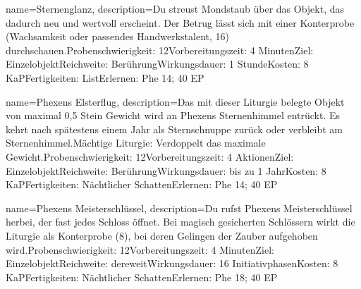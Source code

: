 {
    name={Sternenglanz},
    description={Du streust Mondstaub über das Objekt, das dadurch neu und wertvoll erscheint. Der Betrug lässt sich mit einer Konterprobe (Wachsamkeit oder passendes Handwerkstalent, 16) durchschauen.\newline Probenschwierigkeit: 12\newline Vorbereitungszeit: 4 Minuten\newline Ziel: Einzelobjekt\newline Reichweite: Berührung\newline Wirkungsdauer: 1 Stunde\newline Kosten: 8 KaP\newline Fertigkeiten: List\newline Erlernen: Phe 14; 40 EP}
}


{
    name={Phexens Elsterflug},
    description={Das mit dieser Liturgie belegte Objekt von maximal 0,5 Stein Gewicht wird an Phexens Sternenhimmel entrückt. Es kehrt nach spätestens einem Jahr als Sternschnuppe zurück oder verbleibt am Sternenhimmel.\newline Mächtige Liturgie: Verdoppelt das maximale Gewicht.\newline Probenschwierigkeit: 12\newline Vorbereitungszeit: 4 Aktionen\newline Ziel: Einzelobjekt\newline Reichweite: Berührung\newline Wirkungsdauer: bis zu 1 Jahr\newline Kosten: 8 KaP\newline Fertigkeiten: Nächtlicher Schatten\newline Erlernen: Phe 14; 40 EP}
}


{
    name={Phexens Meisterschlüssel},
    description={Du rufst Phexens Meisterschlüssel herbei, der fast jedes Schloss öffnet. Bei magisch gesicherten Schlössern wirkt die Liturgie als Konterprobe (8), bei deren Gelingen der Zauber aufgehoben wird.\newline Probenschwierigkeit: 12\newline Vorbereitungszeit: 4 Minuten\newline Ziel: Einzelobjekt\newline Reichweite: dereweit\newline Wirkungsdauer: 16 Initiativphasen\newline Kosten: 8 KaP\newline Fertigkeiten: Nächtlicher Schatten\newline Erlernen: Phe 18; 40 EP}
}


